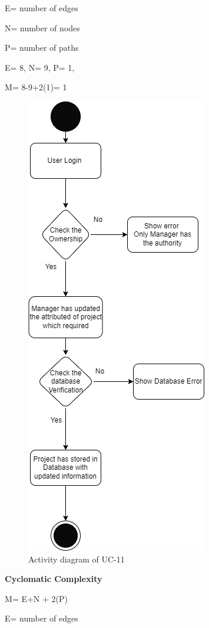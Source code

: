 E= number of edges

N= number of nodes

P= number of paths

E= 8,
N= 9,
P= 1,

M= 8-9+2(1)= 1

\begin{figure}[H]
    \centering
    \includegraphics[scale=0.7]{./diagrams/Activity Diagram/ad-11.png}
    \caption{Activity diagram of UC-11}
    \label{fig:act-11}

\end{figure}


\textbf{Cyclomatic Complexity}

M= E+N + 2(P)

E= number of edges

